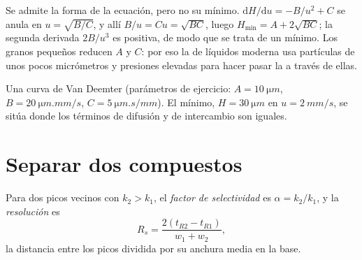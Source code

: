 \admitted

Se admite la forma de la ecuación, pero no su mínimo. $\mathrm dH/\mathrm du = -B/u^2 + C$ se anula
en $u = \sqrt{B/C}$, y allí $B/u = Cu = \sqrt{BC}$, luego $H_{\min} = A + 2\sqrt{BC}$; la segunda
derivada $2B/u^3$ es positiva, de modo que se trata de un mínimo. Los granos pequeños reducen $A$ y $C$: por eso la
 de líquidos moderna usa partículas de unos pocos micrómetros y presiones elevadas para hacer pasar la  a través de ellas.

\begin{omfigure}

{\small Una curva de Van Deemter (parámetros de ejercicio: $A = \qty{10}{\micro m}$, $B = \qty{20}{\micro m.mm/s}$,
$C = \qty{5}{\micro m.s/mm}$). El mínimo, $H = \qty{30}{\micro m}$ en $u = \qty{2}{mm/s}$, se sitúa donde
los términos de difusión y de intercambio son iguales.}
\end{omfigure}

\section{Separar dos compuestos}

\begin{definition}\label{def:b2:chromatography:separation}
Para dos picos vecinos con $k_2 > k_1$, el \emph{factor de selectividad} es
$\alpha = k_2/k_1$, y la \emph{resolución} es
\begin{equation*}
R_s = \frac{2(t_{R2} - t_{R1})}{w_1 + w_2},
\end{equation*}
la distancia entre los picos dividida por su anchura media en la base.
\end{definition}

